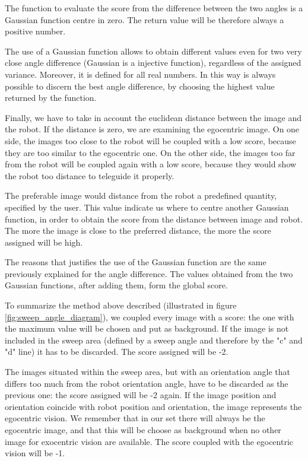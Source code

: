 %
The function to evaluate the score from the difference between the two angles is a Gaussian function centre
in zero. The return value will be therefore always a positive number.
%

%
The use of a Gaussian function allows to obtain different values even for two very close angle difference
(Gaussian is a injective function), regardless of the assigned variance. Moreover, it is defined for all real
numbers.
In this way is always possible to discern the best angle difference, by choosing the highest value returned by
the function.
%

%
Finally, we have to take in account the euclidean distance between the image and the robot. If the distance is
zero, we are examining the egocentric image. On one side, the images too close to the robot will be coupled
with a low score, because they are too similar to the egocentric one. On the other side, the images too far
from the robot will be coupled again with a low score, because they would show the robot too distance to
teleguide it properly.
%

%
The preferable image would distance from the robot a predefined quantity, specified by the user. This value
indicate us where to centre another Gaussian function, in order to obtain the score from the distance between
image and robot. The more the image is close to the preferred distance, the more the score assigned will be high.
%

%
The reasons that justifies the use of the Gaussian function are the same previously explained for the angle
difference. The values obtained from the two Gaussian functions, after adding them, form the global score.
%

%
To summarize the method above described (illustrated in figure \ref{fig:sweep_angle_diagram}), we coupled
every image with a score: the one with the maximum value will be chosen and put as background. If the image is
not included in the sweep area (defined by a sweep angle and therefore by the "c" and "d" line) it has to be
discarded. The score assigned will be -2.
%

%
The images situated within the sweep area, but with an orientation angle that differs too much from the robot
orientation angle, have to be discarded as the previous one: the score assigned will be -2 again.
If the image position and orientation coincide with robot position and orientation, the image represents the
egocentric vision. We remember that in our set there will always be the egocentric image, and that this will be
choose as background when no other image for exocentric vision are available. The score coupled with the egocentric 
vision will be -1.
%

